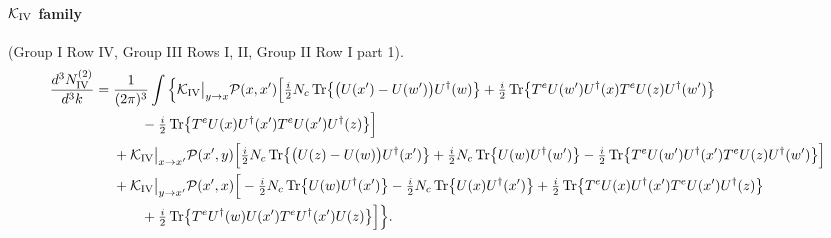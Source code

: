 \documentclass[10pt]{article}
\numberwithin{equation}{section}
\newcommand{\PP}{\mathcal P}
\newcommand{\Tr}{{\rm Tr}}
\newcommand{\Ud}{U^\dagger}
\begin{document}
\paragraph{$\mathcal K_{\rm IV}$ family} (Group I Row IV, Group III Rows I, II, Group II Row I part 1).
\begin{align}
\frac{d^3N^{(2)}_{\rm IV}}{d^3k}={}&\frac{1}{(2\pi)^3}\int\Big\{\mathcal K_{\rm IV}\big|_{y\to x}\PP(x,x')\Big[\tfrac{i}{2}N_c\,\Tr\big\{\big(U(x')-U(w')\big)\Ud(w)\big\}+\tfrac{i}{2}\,\Tr\big\{T^eU(w')\Ud(x)T^eU(z)\Ud(w')\big\}\notag\\
&\qquad-\tfrac{i}{2}\,\Tr\big\{T^eU(x)\Ud(x')T^eU(x')\Ud(z)\big\}\Big]\notag\\
&+\mathcal K_{\rm IV}\big|_{x\to x'}\PP(x',y)\Big[\tfrac{i}{2}N_c\,\Tr\big\{\big(U(z)-U(w)\big)\Ud(x')\big\}+\tfrac{i}{2}N_c\,\Tr\big\{U(w)\Ud(w')\big\}-\tfrac{i}{2}\,\Tr\big\{T^eU(w')\Ud(x')T^eU(z)\Ud(w')\big\}\Big]\notag\\
&+\mathcal K_{\rm IV}\big|_{y\to x'}\PP(x',x)\Big[-\tfrac{i}{2}N_c\,\Tr\big\{U(w)\Ud(x')\big\}-\tfrac{i}{2}N_c\,\Tr\big\{U(x)\Ud(x')\big\}+\tfrac{i}{2}\,\Tr\big\{T^eU(x)\Ud(x')T^eU(x')\Ud(z)\big\}\notag\\
&\qquad+\tfrac{i}{2}\,\Tr\big\{T^e\Ud(w)U(x')T^e\Ud(x')U(z)\big\}\Big]\Big\}.
\end{align}
\end{document}
